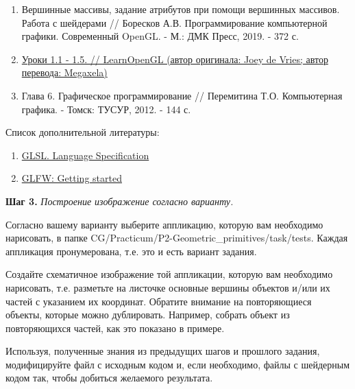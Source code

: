 \documentclass[a4paper,12pt]{article}
\begin{document}
    \begin{enumerate}
        \item 
        Вершинные массивы, задание атрибутов при помощи вершинных массивов. Работа с шейдерами // Боресков А.В. Программирование компьютерной графики. Современный OpenGL. - М.: ДМК Пресс, 2019. - 372 с.
        \item 
        \href{https://habr.com/ru/post/310790/}{Уроки 1.1 - 1.5. // LearnOpenGL (автор оригинала: Joey de Vries; автор перевода: Megaxela)} 
        
        \item
        Глава 6. Графическое программирование // Перемитина Т.О. Компьютерная графика. - Томск: ТУСУР, 2012. - 144 с.
        
        \end{enumerate}

    Список дополнительной литературы:
    
    \begin{enumerate}

    \item 
    \href{https://www.khronos.org/registry/OpenGL/specs/gl/}{GLSL. Language Specification}
    
    \item
    \href{https://www.glfw.org/docs/latest/quick.html}{GLFW: Getting started}

    \end{enumerate}
    
    
    \textbf{Шаг 3.} \textit{Построение изображение согласно варианту.}
    
    Согласно вашему варианту выберите аппликацию, которую вам необходимо нарисовать, в папке \textquotedbl CG/Practicum/P2-Geometric\_primitives/task/tests\textquotedbl. Каждая аппликация пронумерована, т.е. это и есть вариант задания.
    
    Создайте схематичное изображение той аппликации, которую вам необходимо нарисовать, т.е. разметьте на листочке основные вершины объектов и/или их частей с указанием их координат. Обратите внимание на повторяющиеся объекты, которые можно дублировать. Например, собрать объект из повторяющихся частей, как это показано в примере.
    
    Используя, полученные знания из предыдущих шагов и прошлого задания, модифицируйте файл с исходным кодом и, если необходимо, файлы с шейдерным кодом так, чтобы добиться желаемого результата.
\end{document}
